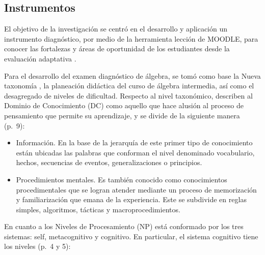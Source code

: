 \documentclass[spanish]{textolivre}
\begin{document}
\subsection{Instrumentos}\label{sec-fmt-manuscrito}
El objetivo de la investigación se centró en el desarrollo y aplicación un instrumento diagnóstico, por medio de la herramienta lección de MOODLE, para conocer las fortalezas y áreas de oportunidad de los estudiantes desde la evaluación adaptativa \cite{dziuban2017,dziuban2016}. 

Para el desarrollo del examen diagnóstico de álgebra, se tomó como base la Nueva taxonomía \cite{marzano2008}, la planeación didáctica del curso de álgebra intermedia, así como el desagregado de niveles de dificultad. Respecto al nivel taxonómico, \textcite{marzano2008} describen al Dominio de Conocimiento (DC) como aquello que hace alusión al proceso de pensamiento que permite su aprendizaje, y se divide de la siguiente manera (p.~9):

\begin{itemize}
\item Información. En la base de la jerarquía de este primer tipo de conocimiento están ubicadas las palabras que conforman el nivel denominado vocabulario, hechos, secuencias de eventos, generalizaciones o principios.
\item Procedimientos mentales. Es también conocido como conocimientos procedimentales que se logran atender mediante un proceso de memorización y familiarización que emana de la experiencia. Este se subdivide en reglas simples, algoritmos, tácticas y macroprocedimientos.
\end{itemize}

En cuanto a los Niveles de Procesamiento (NP) está conformado por los tres sistemas: self, metacognitivo y cognitivo. En particular, el sistema cognitivo tiene los niveles (p.~4 y 5):
\end{document}
